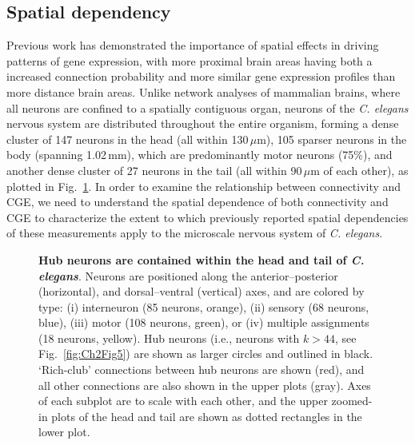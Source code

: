 \subsection{Spatial dependency}
Previous work has demonstrated the importance of spatial effects in driving patterns of gene expression, with more proximal brain areas
\citep{Horvat2016,Wang2016,Markov2013,Henderson2014,Fulcher2016,Noori2017,Levy2012,Azulay2016} having both a increased connection probability and more similar gene expression profiles \citep{Krienen2016, Fulcher2016, Pantazatos2017, Richiardi2017} than more distance brain areas.
Unlike network analyses of mammalian brains, where all neurons are confined to a spatially contiguous organ, neurons of the \emph{C. elegans} nervous system are distributed throughout the entire organism, forming a dense cluster of 147 neurons in the head (all within 130\,$\mu$m), 105 sparser neurons in the body (spanning 1.02\,mm), which are predominantly motor neurons (75\%), and another dense cluster of 27 neurons in the tail (all within 90\,$\mu$m of each other), as plotted in Fig.~\ref{fig:Ch2Fig2}.
In order to examine the relationship between connectivity and CGE, we need to understand the spatial dependence of both connectivity and CGE to characterize the extent to which previously reported spatial dependencies of these measurements apply to the microscale nervous system of \emph{C. elegans}.

\begin{figure}[h]
\caption{\textbf{Hub neurons are contained within the head and tail of \emph{C. elegans}}.
Neurons are positioned along the anterior--posterior (horizontal), and dorsal--ventral (vertical) axes, and are colored by type:
(i) interneuron (85 neurons, orange),
(ii) sensory (68 neurons, blue),
(iii) motor (108 neurons, green), or
(iv) multiple assignments (18 neurons, yellow).
Hub neurons (i.e., neurons with $k > 44$, see Fig.~\ref{fig:Ch2Fig5}) are shown as larger circles and outlined in black.
`Rich-club' connections between hub neurons are shown (red), and all other connections are also shown in the upper plots (gray).
Axes of each subplot are to scale with each other, and the upper zoomed-in plots of the head and tail are shown as dotted rectangles in the lower plot.}
\label{fig:Ch2Fig2}
\end{figure}

